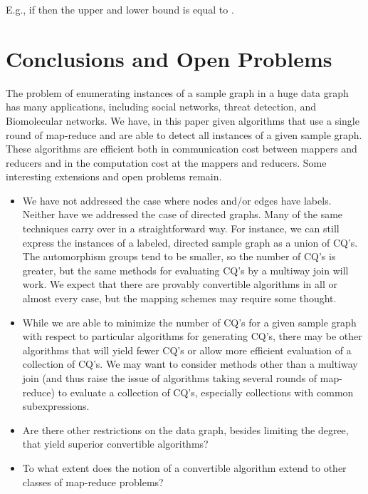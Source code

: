 E.g., if  then the upper and lower bound is equal to .

\section{Conclusions and Open Problems}
\label{conclusions-sect}

The problem of enumerating instances of a sample graph in a huge data graph has many
applications, including social networks, threat detection, and Biomolecular networks.  We have, in this paper given algorithms that use a single round of map-reduce and are able to detect all instances of a given sample graph.  These algorithms are efficient both in communication cost between mappers and reducers and in the computation cost at the mappers and reducers.
Some interesting extensions and open problems remain.

\begin{itemize}

\item
We have not addressed the case where nodes and/or edges have labels.  Neither have we addressed the case of directed graphs.  Many of the same techniques carry over in a straightforward way.  For instance, we can still express the instances of a labeled, directed sample graph as a union of CQ's.  The automorphism groups tend to be smaller, so the number of CQ's is greater, but the same methods for evaluating CQ's by a multiway join will work.
We expect that there are provably convertible algorithms in all or almost every case, but the mapping schemes may require some thought.

\item
While we are able to minimize the number of CQ's for a given sample graph with respect to particular algorithms for generating CQ's, there may be other algorithms that will yield fewer CQ's or allow more efficient evaluation of a collection of CQ's.  We may want to consider methods other than a multiway join (and thus raise the issue of algorithms taking several rounds of map-reduce) to evaluate a collection of CQ's, especially collections with common subexpressions.

\item
Are there other restrictions on the data graph, besides limiting the degree, that yield superior convertible algorithms?

\item
To what extent does the notion of a convertible algorithm extend to other classes of map-reduce problems?
\end{itemize}


%